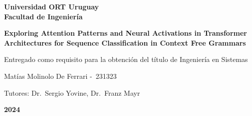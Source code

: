 \begin{center}

\textbf{\fontsize{14pt}{21pt}\selectfont Universidad ORT Uruguay\\Facultad de Ingeniería}

\bigskip\bigskip\bigskip\bigskip


\fontsize{24.88pt}{30pt}\selectfont 
\textbf{Exploring Attention Patterns and Neural Activations in Transformer Architectures for Sequence Classification in Context Free Grammars}


\bigskip\bigskip\bigskip\bigskip


\fontsize{14pt}{21pt}\selectfont Entregado como requisito para la obtención del título de Ingeniería en Sistemas


\bigskip
\bigskip
\bigskip\bigskip\bigskip


\fontsize{14pt}{21pt}\selectfont Matías Molinolo De Ferrari -\ 231323


\bigskip
\bigskip
\bigskip
\bigskip
\fontsize{14pt}{21pt}\selectfont Tutores: Dr.\ Sergio Yovine, Dr.\ Franz Mayr


\bigskip\bigskip\bigskip\bigskip


\fontsize{20.74pt}{21pt}\selectfont \textbf{2024}


\end{center}
\vspace*{\fill}
